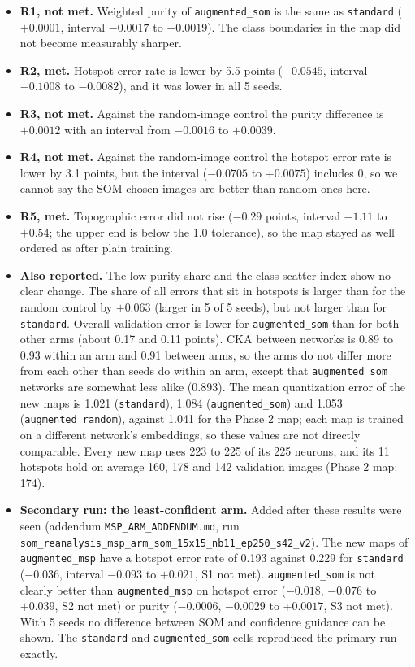 \documentclass[11pt]{article}
\begin{document}
\begin{itemize}[leftmargin=1.4em, itemsep=2pt]
  \item \textbf{R1, not met.} Weighted purity of \texttt{augmented\_som} is the same as \texttt{standard} ($+0.0001$, interval $-0.0017$ to $+0.0019$). The class boundaries in the map did not become measurably sharper.
  \item \textbf{R2, met.} Hotspot error rate is lower by 5.5 points ($-0.0545$, interval $-0.1008$ to $-0.0082$), and it was lower in all 5 seeds.
  \item \textbf{R3, not met.} Against the random-image control the purity difference is $+0.0012$ with an interval from $-0.0016$ to $+0.0039$.
  \item \textbf{R4, not met.} Against the random-image control the hotspot error rate is lower by 3.1 points, but the interval ($-0.0705$ to $+0.0075$) includes 0, so we cannot say the SOM-chosen images are better than random ones here.
  \item \textbf{R5, met.} Topographic error did not rise ($-0.29$ points, interval $-1.11$ to $+0.54$; the upper end is below the 1.0 tolerance), so the map stayed as well ordered as after plain training.
  \item \textbf{Also reported.} The low-purity share and the class scatter index show no clear change. The share of all errors that sit in hotspots is larger than for the random control by $+0.063$ (larger in 5 of 5 seeds), but not larger than for \texttt{standard}. Overall validation error is lower for \texttt{augmented\_som} than for both other arms (about 0.17 and 0.11 points). CKA between networks is 0.89 to 0.93 within an arm and 0.91 between arms, so the arms do not differ more from each other than seeds do within an arm, except that \texttt{augmented\_som} networks are somewhat less alike (0.893). The mean quantization error of the new maps is 1.021 (\texttt{standard}), 1.084 (\texttt{augmented\_som}) and 1.053 (\texttt{augmented\_random}), against 1.041 for the Phase 2 map; each map is trained on a different network's embeddings, so these values are not directly comparable. Every new map uses 223 to 225 of its 225 neurons, and its 11 hotspots hold on average 160, 178 and 142 validation images (Phase 2 map: 174).
  \item \textbf{Secondary run: the least-confident arm.} Added after these results were seen (addendum \texttt{MSP\_ARM\_ADDENDUM.md}, run \texttt{som\_reanalysis\_msp\_arm\_som\_15x15\_nb11\_ep250\_s42\_v2}). The new maps of \texttt{augmented\_msp} have a hotspot error rate of 0.193 against 0.229 for \texttt{standard} ($-0.036$, interval $-0.093$ to $+0.021$, S1 not met). \texttt{augmented\_som} is not clearly better than \texttt{augmented\_msp} on hotspot error ($-0.018$, $-0.076$ to $+0.039$, S2 not met) or purity ($-0.0006$, $-0.0029$ to $+0.0017$, S3 not met). With 5 seeds no difference between SOM and confidence guidance can be shown. The \texttt{standard} and \texttt{augmented\_som} cells reproduced the primary run exactly.
\end{itemize}
\end{document}
